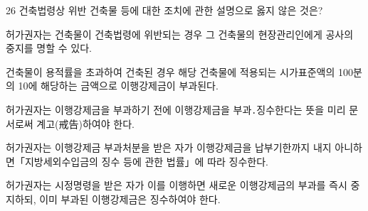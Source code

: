 \begin{question}{26}
건축법령상 위반 건축물 등에 대한 조치에 관한 설명으로 옳지 않은 것은?
\begin{choices}
  \item 허가권자는 건축물이 건축법령에 위반되는 경우 그 건축물의 현장관리인에게 공사의 중지를 명할 수 있다.
  \item 건축물이 용적률을 초과하여 건축된 경우 해당 건축물에 적용되는 시가표준액의 100분의 10에 해당하는 금액으로 이행강제금이 부과된다.
  \item 허가권자는 이행강제금을 부과하기 전에 이행강제금을 부과․징수한다는 뜻을 미리 문서로써 계고(戒告)하여야 한다.
  \item 허가권자는 이행강제금 부과처분을 받은 자가 이행강제금을 납부기한까지 내지 아니하면「지방세외수입금의 징수 등에 관한 법률」에 따라 징수한다.
  \item 허가권자는 시정명령을 받은 자가 이를 이행하면 새로운 이행강제금의 부과를 즉시 중지하되, 이미 부과된 이행강제금은 징수하여야 한다.
\end{choices}
\end{question}

